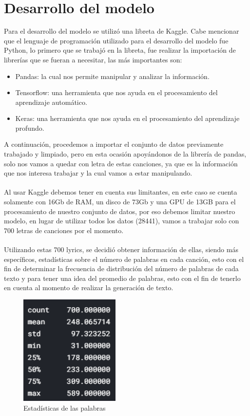 \documentclass[12pt, a4paper, titlepage]{article}
\begin{document}
	\section{Desarrollo del modelo}
	Para el desarrollo del modelo se utilizó una libreta de Kaggle. Cabe mencionar que el lenguaje de programación utilizado para el desarrollo del modelo fue Python, lo primero que se trabajó en la libreta, fue realizar la importación de librerías que se fueran a necesitar, las más importantes son:	
	\begin{itemize}
		\item Pandas: la cual nos permite manipular y analizar la información.
		\item Tensorflow: una herramienta que nos ayuda en el procesamiento del aprendizaje automático.
		\item Keras: una herramienta que nos ayuda en el procesamiento del aprendizaje profundo.
	\end{itemize}
	A continuación, procedemos a importar el conjunto de datos previamente trabajado y limpiado, pero en esta ocasión apoyándonos de la librería de pandas, solo nos vamos a quedar con letra de estas canciones, ya que es la información que nos interesa trabajar y la cual vamos a estar manipulando.\\\\
	Al usar Kaggle debemos tener en cuenta sus limitantes, en este caso se cuenta solamente con 16Gb de RAM, un disco de 73Gb y una GPU de 13GB para el procesamiento de nuestro conjunto de datos, por eso debemos limitar nuestro modelo, en lugar de utilizar todos los datos (28441), vamos a trabajar solo con 700 letras de canciones por el momento.\\\\
	Utilizando estas 700 lyrics, se decidió obtener información de ellas, siendo más específicos, estadísticas sobre el número de palabras en cada canción, esto con el fin de determinar la frecuencia de distribución del número de palabras de cada texto y para tener una idea del promedio de palabras, esto con el fin de tenerlo en cuenta al momento de realizar la generación de texto.
	\begin{figure}[H]
		\includegraphics[width=5cm]{./Imagenes/Modelo/estadistica.png}
		\centering 
		\caption{Estadísticas de las palabras}
	\end{figure}
\end{document}
